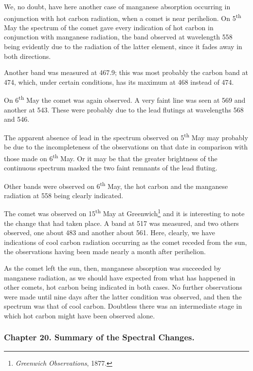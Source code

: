 \documentclass[a4paper, 12pt, oneside, polutonikogreek, english]{article}
\begin{document}
We, no doubt, have here another case of manganese absorption occurring in conjunction with hot carbon radiation, when a comet is near perihelion. On 5\textsuperscript{th} May the spectrum of the comet gave every indication of hot carbon in conjunction with manganese radiation, the band observed at wavelength 558 being evidently due to the radiation of the latter element, since it fades away in both directions.

Another band was measured at 467.9; this was most probably the carbon band at 474, which, under certain conditions, has its maximum at 468 instead of 474.

On 6\textsuperscript{th} May the comet was again observed. A very faint line was seen at 569 and another at 543. These were probably due to the lead flutings at wavelengths 568 and 546.

The apparent absence of lead in the spectrum observed on 5\textsuperscript{th} May may probably be due to the incompleteness of the observations on that date in comparison with those made on 6\textsuperscript{th} May. Or it may be that the greater brightness of the continuous spectrum masked the two faint remnants of the lead fluting.

Other bands were observed on 6\textsuperscript{th} May, the hot carbon and the manganese radiation at 558 being clearly indicated.

The comet was observed on 15\textsuperscript{th} May at Greenwich\footnote{\emph{Greenwich Observations}, 1877.} and it is interesting to note the change that had taken place. A band at 517 was measured, and two others observed, one about 483 and another about 561. Here, clearly, we have indications of cool carbon radiation occurring as the comet receded from the sun, the observations having been made nearly a month after perihelion.

As the comet left the sun, then, manganese absorption was succeeded by manganese radiation, as we should have expected from what has happened in other comets, hot carbon being indicated in both cases. No further observations were made until nine days after the latter condition was observed, and then the spectrum was that of cool carbon. Doubtless there was an intermediate stage in which hot carbon might have been observed alone.
\clearpage
\subsubsection{Chapter 20. Summary of the Spectral Changes.}
\end{document}
